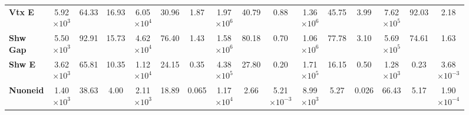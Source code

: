 \begin{figure}
\begin{scriptsize}
\begin{tabular}{|l|ccc|ccc|ccc|ccc|ccc|}
\textbf{Vtx E}         & 5.92$\times 10^3$           & 64.33                                                               & 16.93                                      & 6.05$\times 10^4$             & 30.96                                                                 & 1.87                                         & 1.97$\times 10^6$ & 40.79                                                                  & 0.88                                          & 1.36$\times 10^6$          & 45.75                                                              & 3.99                                      & 7.62$\times 10^5$             & 92.03                                                                 & 2.18                                         \\
\textbf{Shw Gap}          & 5.50$\times 10^3$           & 92.91                                                               & 15.73                                      & 4.62$\times 10^4$             & 76.40                                                                 & 1.43                                         & 1.58$\times 10^6$ & 80.18                                                                  & 0.70                                          & 1.06$\times 10^6$          & 77.78                                                              & 3.10                                      & 5.69$\times 10^5$             & 74.61                                                                 & 1.63                                         \\
\textbf{Shw E}      & 3.62$\times 10^3$           & 65.81                                                               & 10.35                                      & 1.12$\times 10^4$             & 24.15                                                                 & 0.35                                         & 4.38$\times 10^5$              & 27.80                                                                  & 0.20                                          & 1.71$\times 10^5$          & 16.15                                                              & 0.50                                      & 1.28$\times 10^3$             & 0.23                                                                  & 3.68$\times 10^{-3}$                                     \\
\textbf{Nuoneid}      & 1.40$\times 10^3$           & 38.63                                                               & 4.00                                       & 2.11$\times 10^3$             & 18.89                                                                 & 0.065                                        & 1.17$\times 10^4$              & 2.66                                                                   & 5.21$\times 10^{-3}$                                      & 8.99$\times 10^3$          & 5.27                                                               & 0.026                                     & 66.43                & 5.17                                                                  & 1.90$\times 10^{-4}$                                     \\

\end{tabular}
\end{scriptsize}
\end{figure}
